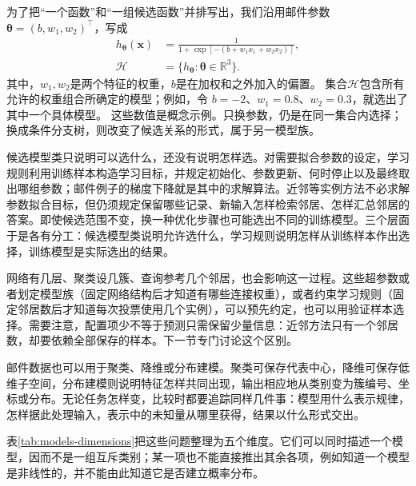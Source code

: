 为了把“一个函数”和“一组候选函数”并排写出，我们沿用邮件参数$\bm{\theta}=(b,w_1,w_2)^{\top}$，写成
\begin{equation}
  \begin{aligned}
    h_{\bm{\theta}}(\bm{x})
      &=\frac{1}{1+\exp[-(b+w_1x_1+w_2x_2)]},\\
    \mathcal{H}&=\{h_{\bm{\theta}}:\bm{\theta}\in\mathbb{R}^{3}\}.
  \end{aligned}
  \label{eq:models-family-example}
\end{equation}
其中，$w_1,w_2$是两个特征的权重，$b$是在加权和之外加入的偏置。
集合$\mathcal{H}$包含所有允许的权重组合所确定的模型；例如，令
$b=-2$、$w_1=0.8$、$w_2=0.3$，就选出了其中一个具体模型。
这些数值是概念示例。只换参数，仍是在同一集合内选择；换成条件分支树，则改变了候选关系的形式，属于另一模型族。

候选模型类只说明可以选什么，还没有说明怎样选。对需要拟合参数的设定，学习规则利用训练样本构造学习目标，并规定初始化、参数更新、何时停止以及最终取出哪组参数；邮件例子的梯度下降就是其中的求解算法。近邻等实例方法不必求解参数拟合目标，但仍须规定保留哪些记录、新输入怎样检索邻居、怎样汇总邻居的答案。即使候选范围不变，换一种优化步骤也可能选出不同的训练模型。三个层面于是各有分工：候选模型类说明允许选什么，学习规则说明怎样从训练样本作出选择，训练模型是实际选出的结果。

网络有几层、聚类设几簇、查询参考几个邻居，也会影响这一过程。这些超参数或者划定模型族（固定网络结构后才知道有哪些连接权重），或者约束学习规则（固定邻居数后才知道每次投票使用几个实例），可以预先约定，也可以用验证样本选择。需要注意，配置项少不等于预测只需保留少量信息：近邻方法只有一个邻居数，却要依赖全部保存的样本。下一节专门讨论这个区别。

邮件数据也可以用于聚类、降维或分布建模。聚类可保存代表中心，降维可保存低维子空间，分布建模则说明特征怎样共同出现，输出相应地从类别变为簇编号、坐标或分布。无论任务怎样变，比较时都要追踪同样几件事：模型用什么表示规律，怎样据此处理输入，表示中的未知量从哪里获得，结果以什么形式交出。

表\ref{tab:models-dimensions}把这些问题整理为五个维度。它们可以同时描述一个模型，因而不是一组互斥类别；某一项也不能直接推出其余各项，例如知道一个模型是非线性的，并不能由此知道它是否建立概率分布。

